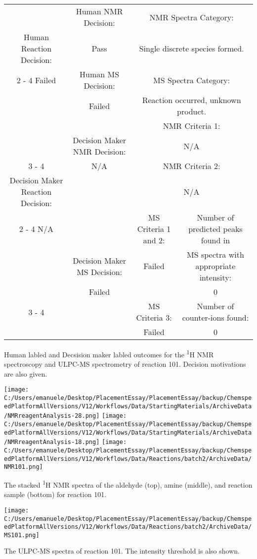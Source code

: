 \documentclass{article}%
\begin{document}
\begin{Decision Table}[H]%
\begin{tabular}{|c|c|c|c|}%
\hline%
&Human NMR Decision:&\multicolumn{2}{|c|}{NMR Spectra Category:}\\%
Human Reaction Decision:&Pass&\multicolumn{2}{|c|}{Single discrete species formed.}\\%
\cline{2%
-%
4}%
Failed&Human MS Decision:&\multicolumn{2}{|c|}{MS Spectra Category:}\\%
&Failed&\multicolumn{2}{|c|}{Reaction occurred, unknown product.}\\%
\hline%
&&\multicolumn{2}{|c|}{NMR Criteria 1:}\\%
&Decision Maker NMR Decision:&\multicolumn{2}{|c|}{N/A}\\%
\cline{3%
-%
4}%
&N/A&\multicolumn{2}{|c|}{NMR Criteria 2:}\\%
Decision Maker Reaction Decision:&&\multicolumn{2}{|c|}{N/A}\\%
\cline{2%
-%
4}%
N/A&&MS Criteria 1 and 2:&Number of predicted peaks found in\\%
&Decision Maker MS Decision:&Failed&MS spectra with appropriate intensity:\\%
&Failed&&0\\%
\cline{3%
-%
4}%
&&MS Criteria 3:&Number of counter{-}ions found:\\%
&&Failed&0\\%
\hline%
\end{tabular}%
\caption{Human labled and Decsision maker labled outcomes for the \textsuperscript{1}H NMR spectroscopy and ULPC-MS spectrometry of reaction 101. Decision motivations are also given.}%
\end{Decision Table}%
\begin{NMR Spectra}[H]%
\begin{center}%
\texttt{[image: C:/Users/emanuele/Desktop/PlacementEssay/PlacementEssay/backup/ChemspeedPlatformAllVersions/V12/Workflows/Data/StartingMaterials/ArchiveData/NMRreagentAnalysis-28.png]}\hfill%
\texttt{[image: C:/Users/emanuele/Desktop/PlacementEssay/PlacementEssay/backup/ChemspeedPlatformAllVersions/V12/Workflows/Data/StartingMaterials/ArchiveData/NMRreagentAnalysis-18.png]}\hfill%
\texttt{[image: C:/Users/emanuele/Desktop/PlacementEssay/PlacementEssay/backup/ChemspeedPlatformAllVersions/V12/Workflows/Data/Reactions/batch2/ArchiveData/NMR101.png]}\hfill%
\end{center}%
\caption{The stacked \textsuperscript{1}H NMR spectra of the aldehyde (top), amine (middle), and reaction sample (bottom) for reaction 101.}%
\end{NMR Spectra}%
\begin{MS Spectra}[H]%
\begin{center}%
\texttt{[image: C:/Users/emanuele/Desktop/PlacementEssay/PlacementEssay/backup/ChemspeedPlatformAllVersions/V12/Workflows/Data/Reactions/batch2/ArchiveData/MS101.png]}\hfill%
\end{center}%
\caption{The ULPC-MS spectra of reaction 101. The intensity threshold is also shown.}%
\end{MS Spectra}%
\end{document}
